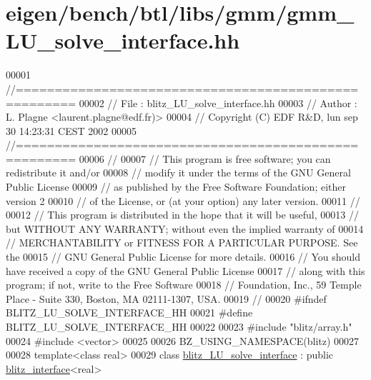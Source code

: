 \hypertarget{eigen_2bench_2btl_2libs_2gmm_2gmm___l_u__solve__interface_8hh_source}{}\section{eigen/bench/btl/libs/gmm/gmm\+\_\+\+L\+U\+\_\+solve\+\_\+interface.hh}
\label{eigen_2bench_2btl_2libs_2gmm_2gmm___l_u__solve__interface_8hh_source}

\begin{DoxyCode}
00001 \textcolor{comment}{//=====================================================}
00002 \textcolor{comment}{// File   :  blitz\_LU\_solve\_interface.hh}
00003 \textcolor{comment}{// Author :  L. Plagne <laurent.plagne@edf.fr)>        }
00004 \textcolor{comment}{// Copyright (C) EDF R&D,  lun sep 30 14:23:31 CEST 2002}
00005 \textcolor{comment}{//=====================================================}
00006 \textcolor{comment}{// }
00007 \textcolor{comment}{// This program is free software; you can redistribute it and/or}
00008 \textcolor{comment}{// modify it under the terms of the GNU General Public License}
00009 \textcolor{comment}{// as published by the Free Software Foundation; either version 2}
00010 \textcolor{comment}{// of the License, or (at your option) any later version.}
00011 \textcolor{comment}{// }
00012 \textcolor{comment}{// This program is distributed in the hope that it will be useful,}
00013 \textcolor{comment}{// but WITHOUT ANY WARRANTY; without even the implied warranty of}
00014 \textcolor{comment}{// MERCHANTABILITY or FITNESS FOR A PARTICULAR PURPOSE.  See the}
00015 \textcolor{comment}{// GNU General Public License for more details.}
00016 \textcolor{comment}{// You should have received a copy of the GNU General Public License}
00017 \textcolor{comment}{// along with this program; if not, write to the Free Software}
00018 \textcolor{comment}{// Foundation, Inc., 59 Temple Place - Suite 330, Boston, MA  02111-1307, USA.}
00019 \textcolor{comment}{// }
00020 \textcolor{preprocessor}{#ifndef BLITZ\_LU\_SOLVE\_INTERFACE\_HH}
00021 \textcolor{preprocessor}{#define BLITZ\_LU\_SOLVE\_INTERFACE\_HH}
00022 
00023 \textcolor{preprocessor}{#include "blitz/array.h"}
00024 \textcolor{preprocessor}{#include <vector>}
00025 
00026 BZ\_USING\_NAMESPACE(blitz)
00027 
00028 \textcolor{keyword}{template}<\textcolor{keyword}{class} real>
00029 \textcolor{keyword}{class }\hyperlink{classblitz___l_u__solve__interface}{blitz\_LU\_solve\_interface} : \textcolor{keyword}{public} \hyperlink{classblitz__interface}{blitz\_interface}<real>

\end{DoxyCode}
